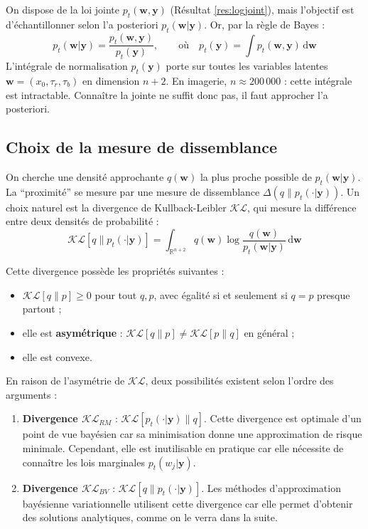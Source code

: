 \documentclass[12pt]{article}
\newcommand{\w}{\boldsymbol{w}}
\newcommand{\y}{\boldsymbol{y}}
\begin{document}
On dispose de la loi jointe $p_t(\w, \y)$ (Résultat 
\ref{res:logjoint}), mais l'objectif est d'échantillonner selon l'a posteriori $p_t(\w | \y)$. Or, par la règle de Bayes 
:
\[
p_t(\w | \y) = \frac{p_t(\w, \y)}{p_t(\y)}, \qquad \text{où} \quad p_t(\y) = \int p_t(\w, \y)\, \mathrm{d}\w
\]
L'intégrale de normalisation $p_t(\y)$ porte sur toutes les variables latentes $\w = (x_0, \tau_r, \tau_b)$ en dimension $n + 2$. En imagerie, $n \approx 200\,000$ : cette intégrale est intractable. Connaître la jointe ne suffit donc pas, il faut approcher l'a posteriori.

\subsection{Choix de la mesure de dissemblance}

On cherche une densité approchante $q(\w)$ la plus proche possible de $p_t(\w | \y)$. La ``proximité'' se mesure par une mesure de dissemblance $\Delta(q \| p_t(\cdot|\y))$. Un choix naturel est la divergence de Kullback-Leibler $\mathcal{KL}$, qui mesure la différence entre deux densités de probabilité :
\begin{equation}
    \mathcal{KL}[q \| p_t(\cdot|\y)] = \int_{\mathbb{R}^{n+2}} q(\w) \log \frac{q(\w)}{p_t(\w|\y)}\, \mathrm{d}\w
    \label{eq:kl_def}
\end{equation}

Cette divergence possède les propriétés suivantes :
\begin{itemize}
    \item $\mathcal{KL}[q \| p] \geq 0$ pour tout $q, p$, avec égalité si et seulement si $q = p$ presque partout ;
    \item elle est \textbf{asymétrique} : $\mathcal{KL}[q \| p] \neq \mathcal{KL}[p \| q]$ en général ;
    \item elle est convexe.
\end{itemize}

En raison de l'asymétrie de $\mathcal{KL}$, deux possibilités existent selon l'ordre des arguments :

\begin{enumerate}[label=(\roman*)]
    \item \textbf{Divergence $\mathcal{KL}_{RM}$} : $\mathcal{KL}[p_t(\cdot|\y) \| q]$. Cette divergence est optimale d'un point de vue bayésien car sa minimisation donne une approximation de risque minimale. Cependant, elle est inutilisable en pratique car elle nécessite de connaître les lois marginales $p_t(w_j | \y)$.
    
    \item \textbf{Divergence $\mathcal{KL}_{BV}$} : $\mathcal{KL}[q \| p_t(\cdot|\y)]$. Les méthodes d'approximation bayésienne variationnelle utilisent cette divergence car elle permet d'obtenir des solutions analytiques, comme on le verra dans la suite.
\end{enumerate}
\end{document}
